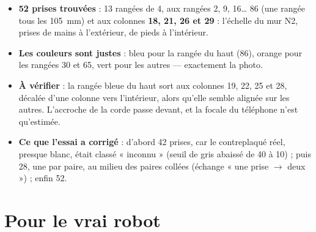 \documentclass[11pt,a4paper]{article}
\begin{document}
\begin{itemize}
  \item \textbf{52 prises trouvées} : 13 rangées de 4, aux rangées 2, 9, 16\ldots{} 86 (une rangée tous les 105~mm) et aux
        colonnes \textbf{18, 21, 26 et 29} : l'échelle du mur N2, prises de mains à l'extérieur, de pieds à l'intérieur.
  \item \textbf{Les couleurs sont justes} : bleu pour la rangée du haut (86), orange pour les rangées 30 et 65, vert pour
        les autres --- exactement la photo.
  \item \textbf{À vérifier} : la rangée bleue du haut sort aux colonnes 19, 22, 25 et 28, décalée d'une colonne vers
        l'intérieur, alors qu'elle semble alignée sur les autres. L'accroche de la corde passe devant, et la focale du
        téléphone n'est qu'estimée.
  \item \textbf{Ce que l'essai a corrigé} : d'abord 42 prises, car le contreplaqué réel, presque blanc, était classé
        « inconnu » (seuil de gris abaissé de 40 à 10) ; puis 28, une par paire, au milieu des paires collées (échange
        « une prise $\to$ deux ») ; enfin 52.
\end{itemize}

\section{Pour le vrai robot}
\end{document}
